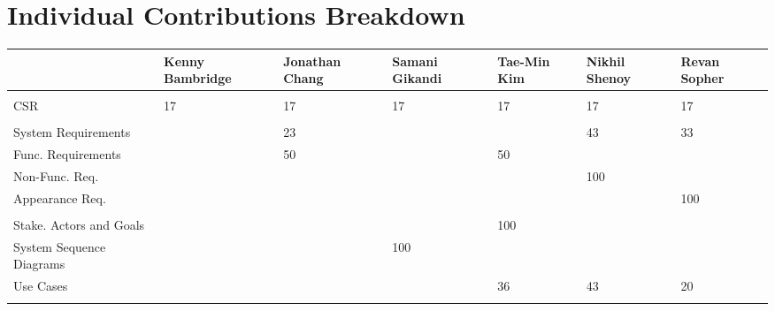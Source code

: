 \documentclass[letterpaper,english, 12pt]{scrreprt}
\begin{document}
\chapter*{Individual Contributions Breakdown}
\begin{center}
	\begin{tabular}{|l|C{2cm}|C{1.5cm}|C{1.5cm}|C{1.5cm}|C{1.5cm}|C{1.5cm}|}
		\hline
                        &Kenny Bambridge& Jonathan Chang& Samani Gikandi& Tae-Min Kim   & Nikhil Shenoy & Revan Sopher  \\ \hline
                        &               &               &               &               &               &               \\ \hline
CSR                     &      17       &      17       &       17      &      17       &       17      &       17      \\ \hline
                        &               &               &               &               &               &               \\ \hline

System Requirements     &               &      23       &               &               &       43      &       33      \\ \hline
Func. Requirements      &               &      50       &               &      50       &               &               \\ \hline
Non-Func. Req.          &               &               &               &               &      100      &               \\ \hline
Appearance Req.         &               &               &               &               &               &      100      \\ \hline
                        &               &               &               &               &               &               \\ \hline

Stake. Actors and Goals &               &               &               &     100       &               &               \\ \hline
System Sequence Diagrams&               &               &      100      &               &               &               \\ \hline
Use Cases               &               &               &               &      36       &       43      &       20      \\ \hline
                        &               &               &               &               &               &               \\ \hline


\end{tabular}
\end{center}
\end{document}

